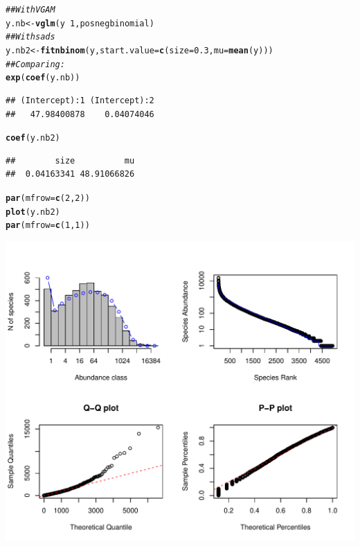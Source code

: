 \documentclass[12pt, A4]{article}\usepackage[]{graphicx}\usepackage[]{color}
\makeatletter
\def\maxwidth{ %
  \ifdim\Gin@nat@width>\linewidth
    \linewidth
  \else
    \Gin@nat@width
  \fi
}
\newcommand{\hlnum}[1]{\textcolor[rgb]{0.686,0.059,0.569}{#1}}%
\newcommand{\hlcom}[1]{\textcolor[rgb]{0.678,0.584,0.686}{\textit{#1}}}%
\newcommand{\hlopt}[1]{\textcolor[rgb]{0,0,0}{#1}}%
\newcommand{\hlstd}[1]{\textcolor[rgb]{0.345,0.345,0.345}{#1}}%
\newcommand{\hlkwb}[1]{\textcolor[rgb]{0.69,0.353,0.396}{#1}}%
\newcommand{\hlkwc}[1]{\textcolor[rgb]{0.333,0.667,0.333}{#1}}%
\newcommand{\hlkwd}[1]{\textcolor[rgb]{0.737,0.353,0.396}{\textbf{#1}}}%
\newenvironment{kframe}{%
 \def\at@end@of@kframe{}%
 \ifinner\ifhmode%
  \def\at@end@of@kframe{\end{minipage}}%
  \begin{minipage}{\columnwidth}%
 \fi\fi%
 \def\FrameCommand##1{\hskip\@totalleftmargin \hskip-\fboxsep
 \colorbox{shadecolor}{##1}\hskip-\fboxsep
     \hskip-\linewidth \hskip-\@totalleftmargin \hskip\columnwidth}%
 \MakeFramed {\advance\hsize-\width
   \@totalleftmargin\z@ \linewidth\hsize
   \@setminipage}}%
 {\par\unskip\endMakeFramed%
 \at@end@of@kframe}
\newenvironment{knitrout}{}{} %
\makeatother
\begin{document}
 
\begin{knitrout}
\color{fgcolor}\begin{kframe}
\begin{alltt}
\hlcom{## With VGAM}
\hlstd{y.nb} \hlkwb{<-} \hlkwd{vglm}\hlstd{(y} \hlopt{~} \hlnum{1}\hlstd{, posnegbinomial)}
\hlcom{## With sads}
\hlstd{y.nb2} \hlkwb{<-} \hlkwd{fitnbinom}\hlstd{(y,} \hlkwc{start.value}\hlstd{=}\hlkwd{c}\hlstd{(}\hlkwc{size}\hlstd{=}\hlnum{0.3}\hlstd{,} \hlkwc{mu}\hlstd{=}\hlkwd{mean}\hlstd{(y)))}
\hlcom{## Comparing: }
\hlkwd{exp}\hlstd{(}\hlkwd{coef}\hlstd{(y.nb))}
\end{alltt}
\begin{verbatim}
## (Intercept):1 (Intercept):2 
##   47.98400878    0.04074046
\end{verbatim}
\begin{alltt}
\hlkwd{coef}\hlstd{(y.nb2)}
\end{alltt}
\begin{verbatim}
##        size          mu 
##  0.04163341 48.91066826
\end{verbatim}
\end{kframe}
\end{knitrout}

\begin{knitrout}
\color{fgcolor}\begin{kframe}
\begin{alltt}
\hlkwd{par}\hlstd{(}\hlkwc{mfrow}\hlstd{=}\hlkwd{c}\hlstd{(}\hlnum{2}\hlstd{,}\hlnum{2}\hlstd{))}
\hlkwd{plot}\hlstd{(y.nb2)}
\hlkwd{par}\hlstd{(}\hlkwc{mfrow}\hlstd{=}\hlkwd{c}\hlstd{(}\hlnum{1}\hlstd{,}\hlnum{1}\hlstd{))}
\end{alltt}
\end{kframe}

{\centering \includegraphics[width=\maxwidth]{figure/nb_plots-1} 

}



\end{knitrout}
\end{document}
